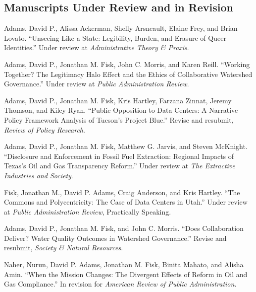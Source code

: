 \documentclass[11pt,letterpaper]{article}
\renewenvironment{itemize}{
  \begin{list}{}{
    \setlength{\leftmargin}{1.5em}
    \setlength{\itemsep}{0.25em}
    \setlength{\parskip}{0pt}
    \setlength{\parsep}{0.25em}
  }
}{
  \end{list}
}
\begin{document}
\subsection*{Manuscripts Under Review and in Revision}
\begin{itemize}\leftmargin=2pt\itemindent=-15pt\leftmargin=2pt\itemindent=-15pt

    \item Adams, David P., Alissa Ackerman, Shelly Arsneault, Elaine Frey, and Brian Lovato. ``Unseeing Like a State: Legibility, Burden, and Erasure of Queer Identities.'' Under review at \emph{Administrative Theory \& Praxis}.


    \item Adams, David P., Jonathan M. Fisk, John C. Morris, and Karen Reill. ``Working Together? The Legitimacy Halo Effect and the Ethics of Collaborative Watershed Governance.'' Under review at \emph{Public Administration Review}.

    \item Adams, David P., Jonathan M. Fisk, Kris Hartley, Farzana Zinnat, Jeremy Thomson, and Kiley Ryan. ``Public Opposition to Data Centers: A Narrative Policy Framework Analysis of Tucson's Project Blue.'' Revise and resubmit, \emph{Review of Policy Research}.

    \item Adams, David P., Jonathan M. Fisk, Matthew G. Jarvis, and Steven McKnight. ``Disclosure and Enforcement in Fossil Fuel Extraction: Regional Impacts of Texas's Oil and Gas Transparency Reform.'' Under review at \emph{The Extractive Industries and Society}.

    \item Fisk, Jonathan M., David P. Adams, Craig Anderson, and Kris Hartley. ``The Commons and Polycentricity: The Case of Data Centers in Utah.'' Under review at \emph{Public Administration Review}, Practically Speaking.

    \item Adams, David P., Jonathan M. Fisk, and John C. Morris. ``Does Collaboration Deliver? Water Quality Outcomes in Watershed Governance.'' Revise and resubmit, \emph{Society \& Natural Resources}.

    \item Naher, Nurun, David P. Adams, Jonathan M. Fisk, Binita Mahato, and Alisha Amin. ``When the Mission Changes: The Divergent Effects of Reform in Oil and Gas Compliance.'' In revision for \emph{American Review of Public Administration}.

  \end{itemize}
\end{document}
